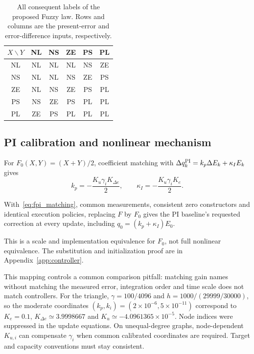 \begin{table}[t]
\caption{All consequent labels of the proposed Fuzzy law. Rows and columns
are the present-error and error-difference inputs, respectively.}
\label{tab:fpi_full_rules}
\centering
\begin{tabular}{@{}c|ccccc@{}}\toprule
$X\backslash Y$ & NL & NS & ZE & PS & PL\\\midrule
NL & NL & NL & NL & NS & ZE\\
NS & NL & NL & NS & ZE & PS\\
ZE & NL & NS & ZE & PS & PL\\
PS & NS & ZE & PS & PL & PL\\
PL & ZE & PS & PL & PL & PL\\\bottomrule
\end{tabular}
\end{table}

\subsection{PI calibration and nonlinear mechanism}
\label{subsec:fpi_calibration}
For $F_0(X,Y)=(X+Y)/2$, coefficient matching with
$\Delta q_k^{\rm PI}=k_p\Delta E_k+\kappa_I E_k$ gives
\begin{equation}
 k_p=-\frac{K_u\gamma_iK_{\Delta e}}2,\qquad
 \kappa_I=-\frac{K_u\gamma_iK_e}2.
 \label{eq:fpi_matching}
\end{equation}
\begin{btdproposition}
\label{prop:fpi_equivalence}
With~\eqref{eq:fpi_matching}, common measurements, consistent zero
constructors and identical execution policies, replacing $F$ by $F_0$
gives the PI baseline's requested correction at every update, including
$q_0=(k_p+\kappa_I)E_0$.
\end{btdproposition}
This is a scale and implementation equivalence for $F_0$, not full
nonlinear equivalence. The substitution and initialization proof are
in Appendix~\ref{app:controller}.

This mapping controls a common comparison pitfall: matching gain names
without matching the measured error, integration order and time scale
does not match controllers. For the triangle, $\gamma=100/4096$ and
$h=1000/(29999/30000)$, so the moderate coordinates
$(k_p,k_i)=(2\times10^{-6},5\times10^{-11})$ correspond to
$K_e=0.1$, $K_{\Delta e}\simeq3.9998667$ and
$K_u\simeq-4.0961365\times10^{-5}$. Node indices were suppressed
in the update equations. On unequal-degree graphs, node-dependent
$K_{u,i}$ can compensate $\gamma_i$ when common calibrated coordinates
are required. Target and capacity conventions must stay consistent.

